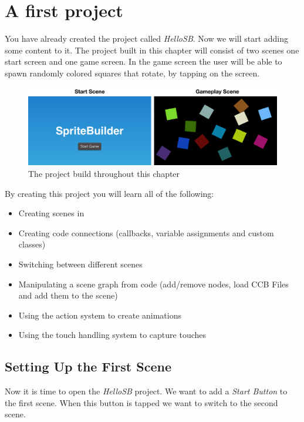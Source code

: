 \section{A first \SB{} project} 
You have already created the \SB{} project called \textit{HelloSB}. Now we will
start adding some content to it. The project built in this chapter will consist
of two scenes one start screen and one game screen. In the game screen the user will be able to spawn randomly
colored squares that rotate, by tapping on the screen.
\begin{figure}[H]
		\centering
		\includegraphics[width=0.9\linewidth]{images/firstproject/first_project.png}
		\caption{The project build throughout this chapter}
\end{figure}
By creating this project you will learn all of the following:
\begin{itemize}
  \item Creating scenes in \SB{}
  \item Creating code connections (callbacks, variable assignments and custom
  classes)
  \item Switching between different scenes
  \item Manipulating a scene graph from code (add/remove nodes, load CCB Files
  and add them to the scene)
  \item Using the \cocos{} action system to create animations
  \item Using the \cocos{} touch handling system to capture touches
\end{itemize}

\subsection{Setting Up the First Scene}
Now it is time to open the \textit{HelloSB} \SB{} project. We want to add a
\textit{Start Button} to the first scene. When this button is tapped we want to
switch to the second scene. 

